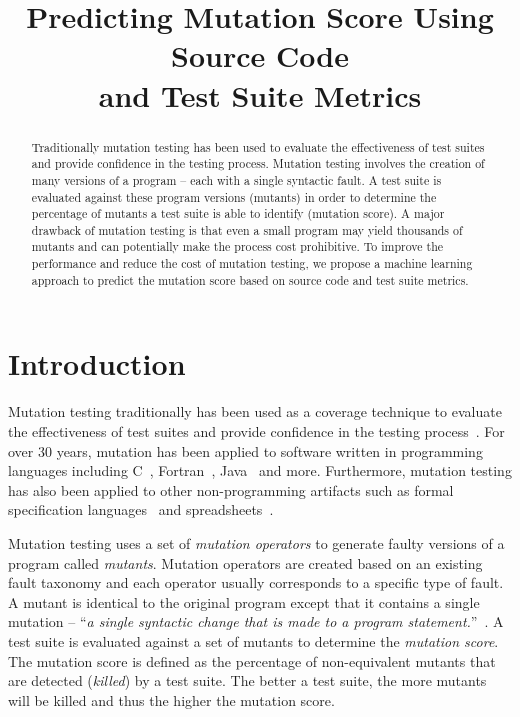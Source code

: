 \documentclass[conference]{IEEEtran}
\begin{document}
\title{Predicting Mutation Score Using Source Code\\and Test Suite Metrics}


\author{
}


\maketitle


\begin{abstract}
Traditionally mutation testing has been used to evaluate the effectiveness of test suites and provide confidence in the testing process. Mutation testing involves the creation of many versions of a program -- each with a single syntactic fault. A test suite is evaluated against these program versions (mutants) in order to determine the percentage of mutants a test suite is able to identify (mutation score). A major drawback of mutation testing is that even a small program may yield thousands of mutants and can potentially make the process cost prohibitive. To improve the performance and reduce the cost of mutation testing, we propose a machine learning approach to predict the mutation score based on source code and test suite metrics.
\end{abstract}


\IEEEpeerreviewmaketitle


\section{Introduction}
\label{sec:introduction}
Mutation testing traditionally has been used as a coverage technique to evaluate the effectiveness of test suites and provide confidence in the testing process~\cite{DLS78, OAL06, JH10}. For over 30 years, mutation has been applied to software written in programming languages including C~\cite{DM96, JH08}, Fortran~\cite{KO91}, Java~\cite{MKO02, BCD06} and more. Furthermore, mutation testing has also been applied to other non-programming artifacts such as formal specification languages~\cite{ABM98} and spreadsheets~\cite{AE09}.

Mutation testing uses a set of \emph{mutation operators} to generate faulty versions of a program called \emph{mutants}. Mutation operators are created based on an existing fault taxonomy and each operator usually corresponds to a specific type of fault. A mutant is identical to the original program except that it contains a single mutation -- ``\emph{a single syntactic change that is made to a program statement.}''~\cite{KO91}. A test suite is evaluated against a set of mutants to determine the \emph{mutation score}. The mutation score is defined as the percentage of non-equivalent mutants that are detected (\emph{killed}) by a test suite. The better a test suite, the more mutants will be killed and thus the higher the mutation score.
\end{document}
